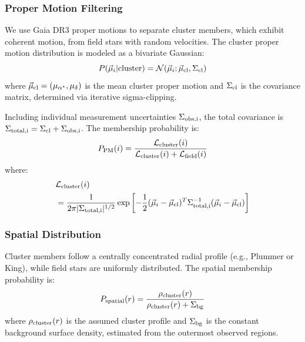 \documentclass[linenumbers,trackchanges,twocolumn]{aastex701}
\begin{document}
\subsubsection{Proper Motion Filtering}

We use Gaia DR3 \citep{gaiadr3,brown2021} proper motions to separate cluster members, which exhibit coherent motion, from field stars with random velocities. The cluster proper motion distribution is modeled as a bivariate Gaussian:
\begin{equation}
P(\vec{\mu}_i | {\rm cluster}) = \mathcal{N}(\vec{\mu}_i; \vec{\mu}_{\rm cl}, \Sigma_{\rm cl})
\end{equation}
where $\vec{\mu}_{\rm cl} = (\mu_{\alpha^*}, \mu_\delta)$ is the mean cluster proper motion and $\Sigma_{\rm cl}$ is the covariance matrix, determined via iterative sigma-clipping.

Including individual measurement uncertainties $\Sigma_{\rm obs,i}$, the total covariance is $\Sigma_{\rm total,i} = \Sigma_{\rm cl} + \Sigma_{\rm obs,i}$. The membership probability is:
\begin{equation}
P_{\rm PM}(i) = \frac{\mathcal{L}_{\rm cluster}(i)}{\mathcal{L}_{\rm cluster}(i) + \mathcal{L}_{\rm field}(i)}
\end{equation}
where:
\begin{equation}
\begin{split}
&\mathcal{L}_{\rm cluster}(i) \\ 
&= \frac{1}{2\pi |\Sigma_{\rm total,i}|^{1/2}} \exp\left[ -\frac{1}{2} (\vec{\mu}_i - \vec{\mu}_{\rm cl})^T \Sigma_{\rm total,i}^{-1} (\vec{\mu}_i - \vec{\mu}_{\rm cl}) \right]
\end{split}
\end{equation}

\subsubsection{Spatial Distribution}

Cluster members follow a centrally concentrated radial profile (e.g., Plummer or King), while field stars are uniformly distributed. The spatial membership probability is:
\begin{equation}
P_{\rm spatial}(r) = \frac{\rho_{\rm cluster}(r)}{\rho_{\rm cluster}(r) + \Sigma_{\rm bg}}
\end{equation}
where $\rho_{\rm cluster}(r)$ is the assumed cluster profile and $\Sigma_{\rm bg}$ is the constant background surface density, estimated from the outermost observed regions.
\end{document}
